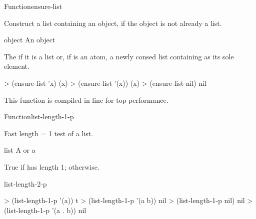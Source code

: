 \documentclass[10pt,twoside,english,pdftex]{article}
\newcommand{\inline}{This function is compiled in-line for top performance.}
\begin{document}

\begin{functiondoc}{Function}{ensure-list}{ \returns{}
    }
%

\fnsyntax

\fnpurpose Construct a list containing an object, if the object is not
already a list.

\fnpackage {}

\fnmodule {}

\fnargs
\begin{args}{object}
\arg[object] An object
\end{args}

\fnreturns The  if it is a list or, if  is
an atom, a newly consed list containing  as its sole element.
  
\fnexamples
\begin{example}
> (ensure-list 'x)
(x)
> (ensure-list '(x))
(x)
> (ensure-list nil)
nil
\end{example}

\fnnote \inline

\end{functiondoc}


\begin{functiondoc}{Function}{list-length-1-p}%
  { \returns{} }
%
%

\fnsyntax

\fnpurpose Fast length = 1 test of a list.

\fnpackage {}

\fnmodule {}

\fnargs
\begin{args}{list}
\arg[list] A  or a 
\end{args}

\fnreturns True if  has length 1; \nil{} otherwise.

\begin{alsos}{list-length-2-p}
\end{alsos}

\fnexamples
\begin{example}
> (list-length-1-p '(a))
t
> (list-length-1-p '(a b))
nil
> (list-length-1-p nil)
nil
> (list-length-1-p '(a . b))
nil
\end{example}

\end{functiondoc}
\end{document}
